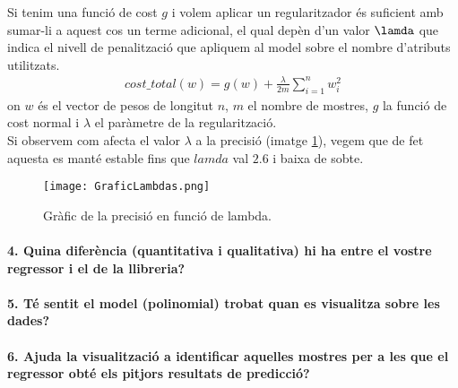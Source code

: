 \documentclass[a4paper, 11pt]{article}
\begin{document}
    Si tenim una funció de cost $g$ i volem aplicar un regularitzador és suficient amb sumar-li
    a aquest cos un terme adicional, el qual depèn d'un valor $\lamda$ que indica el nivell de
    penalització que apliquem al model sobre el nombre d'atributs utilitzats.
    \begin{gather*}
      cost\_total(w) = g(w) + \frac{\lambda}{2m}\sum_{i=1}^n w_i^2
    \end{gather*}
    on $w$ és el vector de pesos de longitut $n$, $m$ el nombre de mostres, $g$ la funció de
    cost normal i $\lambda$ el paràmetre de la regularització.\\
    Si observem com afecta el valor $\lambda$ a la precisió (imatge \ref{fig:GradientLambda}),
    vegem que de fet aquesta es manté estable fins que $lamda$ val $2.6$ i baixa de sobte.


    \begin{figure}[H]
        \centering
        \texttt{[image: GraficLambdas.png]}
        \caption{Gràfic de la precisió en funció de lambda.}
        \label{fig:GradientLambda}
    \end{figure}

    \paragraph{4. Quina diferència (quantitativa i qualitativa) hi ha entre el vostre regressor
    i el de la llibreria?}

    \paragraph{5. Té sentit el model (polinomial) trobat quan es visualitza sobre les dades?}

    \paragraph{6. Ajuda la visualització a identificar aquelles mostres per a les que el regressor
    obté els pitjors resultats de predicció?}

    
\end{document}
